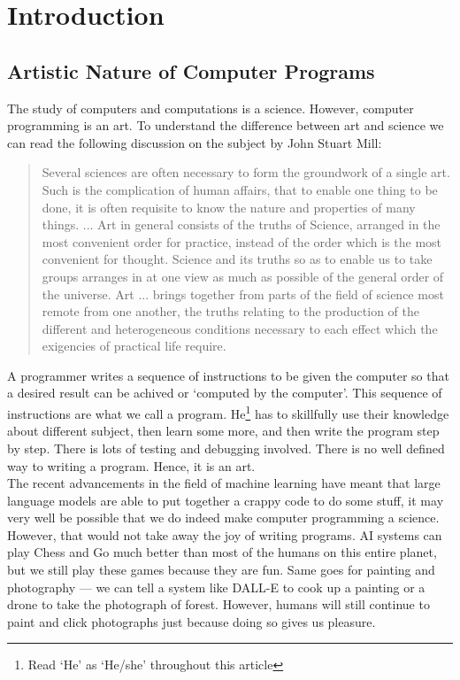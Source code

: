 \section{Introduction}

\subsection{Artistic Nature of Computer Programs}

The study of computers and computations is a science. However, computer programming is an art. To understand
the difference between art and science we can read the following discussion on the subject by John Stuart
Mill:

\begin{quote}
Several sciences are often necessary to form the groundwork of a single art. Such is the complication of human
affairs, that to enable one thing to be done, it is often requisite to know the nature and properties of many
things. ... Art in general consists of the truths of Science, arranged in the most convenient order for
practice, instead of the order which is the most convenient for thought. Science and its truths so as to
enable us to take groups arranges in at one view as much as possible of the general order of the universe. Art
... brings together from parts of the field of science most remote from one another, the truths relating to
the production of the different and heterogeneous conditions necessary to each effect which the exigencies of
practical life require\cite{knuth1992literate}.
\end{quote}

A programmer writes a sequence of instructions to be given the computer so that a desired result can be
achived or `computed by the computer'. This sequence of instructions are what we call a program.
He\footnote{Read `He' as `He/she' throughout this article} has to skillfully use their knowledge about
different subject, then learn some more, and then write the program step by step. There is lots of testing and
debugging involved. There is no well defined way to writing a program. Hence, it is an art. \\

The recent advancements in the field of machine learning have meant that large language models are able to put
together a crappy code to do some stuff, it may very well be possible that we do indeed make computer
programming a science. However, that would not take away the joy of writing programs. AI systems can play
Chess and Go much better than most of the humans on this entire planet, but we still play these games because
they are fun. Same goes for painting and photography --- we can tell a system like DALL-E to cook up a
painting or a drone to take the photograph of forest. However, humans will still continue to paint and click
photographs just because doing so gives us pleasure.

